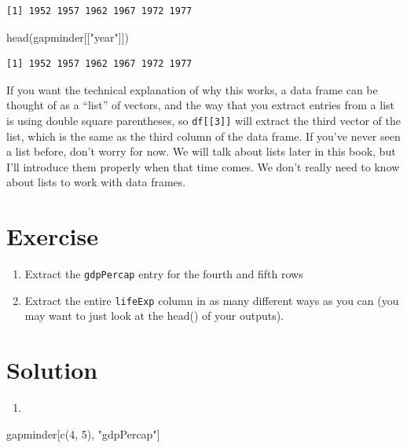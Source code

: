 \documentclass[
  letterpaper,
  DIV=11,
  numbers=noendperiod]{scrreprt}
\newenvironment{Shaded}{\begin{snugshade}}{\end{snugshade}}
\newcommand{\DecValTok}[1]{\textcolor[rgb]{0.68,0.00,0.00}{#1}}
\newcommand{\FunctionTok}[1]{\textcolor[rgb]{0.28,0.35,0.67}{#1}}
\newcommand{\NormalTok}[1]{\textcolor[rgb]{0.00,0.23,0.31}{#1}}
\newcommand{\StringTok}[1]{\textcolor[rgb]{0.13,0.47,0.30}{#1}}
\providecommand{\tightlist}{%
  \setlength{\itemsep}{0pt}\setlength{\parskip}{0pt}}\usepackage{longtable,booktabs,array}
\begin{document}
\begin{verbatim}
[1] 1952 1957 1962 1967 1972 1977
\end{verbatim}

\begin{Shaded}
\begin{Highlighting}[]
\FunctionTok{head}\NormalTok{(gapminder[[}\StringTok{"year"}\NormalTok{]])}
\end{Highlighting}
\end{Shaded}

\begin{verbatim}
[1] 1952 1957 1962 1967 1972 1977
\end{verbatim}

If you want the technical explanation of why this works, a data frame
can be thought of as a ``list'' of vectors, and the way that you extract
entries from a list is using double square parentheses, so
\texttt{df{[}{[}3{]}{]}} will extract the third vector of the list,
which is the same as the third column of the data frame. If you've never
seen a list before, don't worry for now. We will talk about lists later
in this book, but I'll introduce them properly when that time comes. We
don't really need to know about lists to work with data frames.

\section{Exercise}

\begin{enumerate}
\def\labelenumi{\arabic{enumi}.}
\item
  Extract the \texttt{gdpPercap} entry for the fourth and fifth rows
\item
  Extract the entire \texttt{lifeExp} column in as many different ways
  as you can (you may want to just look at the head() of your outputs).
\end{enumerate}

\section{Solution}

\begin{enumerate}
\def\labelenumi{\arabic{enumi}.}
\tightlist
\item
\end{enumerate}

\begin{Shaded}
\begin{Highlighting}[]
\NormalTok{gapminder[}\FunctionTok{c}\NormalTok{(}\DecValTok{4}\NormalTok{, }\DecValTok{5}\NormalTok{), }\StringTok{"gdpPercap"}\NormalTok{]}
\end{Highlighting}
\end{Shaded}
\end{document}
